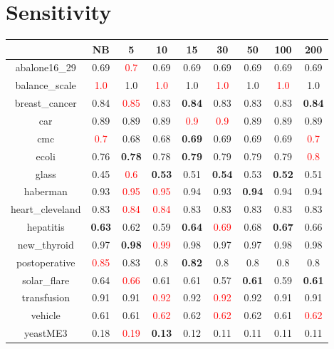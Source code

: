 \documentclass{article}%
\begin{document}
\section*{Sensitivity}%
\begin{tabular}{c|cccccccc}%
\hline%
&NB&5&10&15&30&50&100&200\\%
\hline%
abalone16\_29&0.69&\textcolor{red}{ 
0.7
}&0.69&0.69&0.69&0.69&0.69&0.69\\%
\hline%
balance\_scale&\textcolor{red}{ 
1.0
}&1.0&\textcolor{red}{ 
1.0
}&1.0&\textcolor{red}{ 
1.0
}&1.0&\textcolor{red}{ 
1.0
}&1.0\\%
\hline%
breast\_cancer&0.84&\textcolor{red}{ 
0.85
}&0.83&\textbf{0.84}&0.83&0.83&0.83&\textbf{0.84}\\%
\hline%
car&0.89&0.89&0.89&\textcolor{red}{ 
0.9
}&\textcolor{red}{ 
0.9
}&0.89&0.89&0.89\\%
\hline%
cmc&\textcolor{red}{ 
0.7
}&0.68&0.68&\textbf{0.69}&0.69&0.69&0.69&\textcolor{red}{ 
0.7
}\\%
\hline%
ecoli&0.76&\textbf{0.78}&0.78&\textbf{0.79}&0.79&0.79&0.79&\textcolor{red}{ 
0.8
}\\%
\hline%
glass&0.45&\textcolor{red}{ 
0.6
}&\textbf{0.53}&0.51&\textbf{0.54}&0.53&\textbf{0.52}&0.51\\%
\hline%
haberman&0.93&\textcolor{red}{ 
0.95
}&\textcolor{red}{ 
0.95
}&0.94&0.93&\textbf{0.94}&0.94&0.94\\%
\hline%
heart\_cleveland&0.83&\textcolor{red}{ 
0.84
}&\textcolor{red}{ 
0.84
}&0.83&0.83&0.83&0.83&0.83\\%
\hline%
hepatitis&\textbf{0.63}&0.62&0.59&\textbf{0.64}&\textcolor{red}{ 
0.69
}&0.68&\textbf{0.67}&0.66\\%
\hline%
new\_thyroid&0.97&\textbf{0.98}&\textcolor{red}{ 
0.99
}&0.98&0.97&0.97&0.98&0.98\\%
\hline%
postoperative&\textcolor{red}{ 
0.85
}&0.83&0.8&\textbf{0.82}&0.8&0.8&0.8&0.8\\%
\hline%
solar\_flare&0.64&\textcolor{red}{ 
0.66
}&0.61&0.61&0.57&\textbf{0.61}&0.59&\textbf{0.61}\\%
\hline%
transfusion&0.91&0.91&\textcolor{red}{ 
0.92
}&0.92&\textcolor{red}{ 
0.92
}&0.92&0.91&0.91\\%
\hline%
vehicle&0.61&0.61&\textcolor{red}{ 
0.62
}&0.62&\textcolor{red}{ 
0.62
}&0.62&0.61&\textcolor{red}{ 
0.62
}\\%
\hline%
yeastME3&0.18&\textcolor{red}{ 
0.19
}&\textbf{0.13}&0.12&0.11&0.11&0.11&0.11\\%

\end{tabular}
\end{document}

